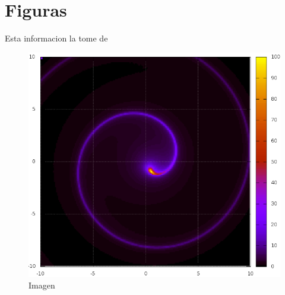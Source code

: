 \documentclass[12pt]{article}
\begin{document}
\section{Figuras}
Esta informacion la tome de \cite{anderson2008}
\begin{figure}
\centering
\includegraphics[scale=0.50]{Circulo09c.png}
\caption{Imagen}\label{Fi:Imag}
\end{figure}


\end{document}

